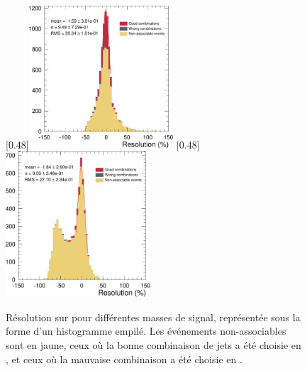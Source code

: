 \begin{figure}[tbp] \centering
    [0.48\textwidth]{\includegraphics[width=0.48\textwidth]{chapitre7/figs/mtt_resolution_zprime_750_narrow.pdf}} \hfill
    [0.48\textwidth]{\includegraphics[width=0.48\textwidth]{chapitre7/figs/mtt_resolution_zprime_2000_narrow.pdf}}
    \caption{Résolution sur \mtt pour différentes masses de signal, représentée sous la forme d'un histogramme empilé. Les événements non-associables sont en jaune, ceux où la bonne combinaison de jets a été choisie en \rouge, et ceux où la mauvaise combinaison a été choisie en \gris.}
    \label{fig:mtt_reso_zprime}
\end{figure}

